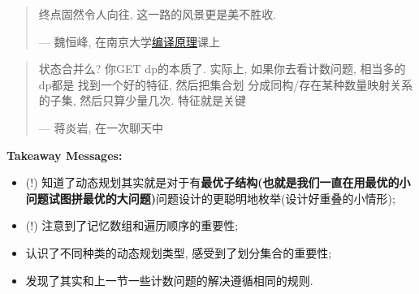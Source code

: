 \begin{quote}
    终点固然令人向往, 这一路的风景更是美不胜收. 

    \hfill --- 魏恒峰, 在南京大学\href{https://www.bilibili.com/video/BV1K24y1u7eA}{编译原理}课上
\end{quote}

\begin{quote}
    状态合并么? 你GET dp的本质了. 实际上, 如果你去看计数问题, 相当多的dp都是
    找到一个好的特征, 然后把集合划
    分成同构/存在某种数量映射关系的子集, 然后只算少量几次. 特征就是关键

    \hfill --- 蒋炎岩, 在一次聊天中
\end{quote}

\textbf{Takeaway Messages: }
\begin{itemize}
    \item (!) 知道了动态规划其实就是对于有\textbf{最优子结构(也就是我们一直在用最优的小问题试图拼最优的大问题)}问题设计的更聪明地枚举(设计好重叠的小情形);
    \item (!) 注意到了记忆数组和遍历顺序的重要性;
    \item 认识了不同种类的动态规划类型, 感受到了划分集合的重要性;
    \item 发现了其实和上一节一些计数问题的解决遵循相同的规则.
\end{itemize}
